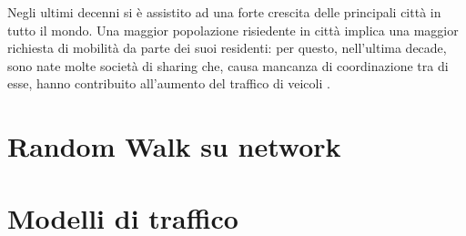 \documentclass[../main.tex]{subfiles}
\begin{document}
Negli ultimi decenni si è assistito ad una forte crescita delle principali città in tutto il mondo.
Una maggior popolazione risiedente in città implica una maggior richiesta di mobilità da parte dei suoi residenti: per questo, nell'ultima decade, sono nate molte società di sharing che, causa mancanza di coordinazione tra di esse, hanno contribuito all'aumento del traffico di veicoli \cite{Kondor2022}.

\section*{Random Walk su network}

\section*{Modelli di traffico}
\end{document}
